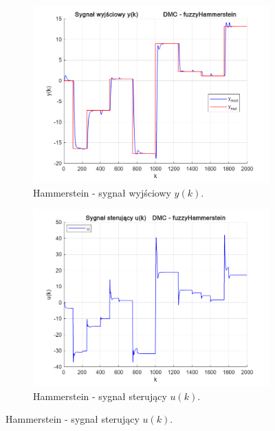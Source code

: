\begin{figure}[b!]
\centering
\begin{subfigure}[b]{0.49\paperwidth}
\centering
\includegraphics[width=\linewidth]{pictures/y_fuzzyHammerstein}
\caption{Hammerstein - sygnał wyjściowy $y(k)$.}
\end{subfigure}
\hfill
\begin{subfigure}[b]{0.49\paperwidth}
\centering
\includegraphics[width=\linewidth]{pictures/u_fuzzyHammerstein}
\caption{Hammerstein -  sygnał sterujący $u(k)$.}
\end{subfigure}
    
\vspace{0.5cm} %


\end{figure}
